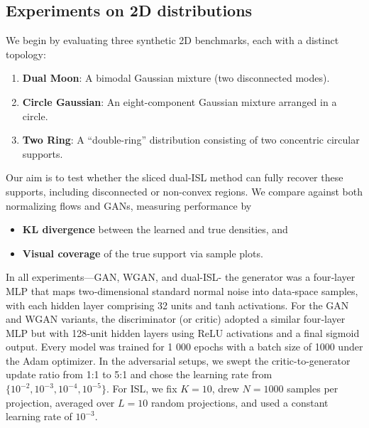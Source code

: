 \documentclass{article}
\begin{document}



\subsection{Experiments on 2D distributions}

We begin by evaluating three synthetic 2D benchmarks, each with a distinct topology:
\begin{enumerate}
  \item \textbf{Dual Moon}: A bimodal Gaussian mixture (two disconnected modes).
  \item \textbf{Circle Gaussian}: An eight-component Gaussian mixture arranged in a circle.
  \item \textbf{Two Ring}: A “double-ring” distribution consisting of two concentric circular supports.
\end{enumerate}
Our aim is to test whether the sliced dual-ISL method can fully recover these supports, including disconnected or non-convex regions.  We compare against both normalizing flows and GANs, measuring performance by
\begin{itemize}
  \item \textbf{KL divergence} between the learned and true densities, and
  \item \textbf{Visual coverage} of the true support via sample plots.
\end{itemize}

In all experiments—GAN, WGAN, and dual-ISL- the generator was a four‐layer MLP that maps two‐dimensional standard normal noise into data‐space samples, with each hidden layer comprising 32 units and tanh activations.  For the GAN and WGAN variants, the discriminator (or critic) adopted a similar four‐layer MLP but with 128‐unit hidden layers using ReLU activations and a final sigmoid output.  Every model was trained for 1 000 epochs with a batch size of 1000 under the Adam optimizer.  In the adversarial setups, we swept the critic-to-generator update ratio from 1:1 to 5:1 and chose the learning rate from $\{10^{-2},10^{-3},10^{-4},10^{-5}\}$.  For ISL, we fix $K=10$, drew $N=1000$ samples per projection, averaged over $L=10$ random projections, and used a constant learning rate of $10^{-3}$.
\end{document}
